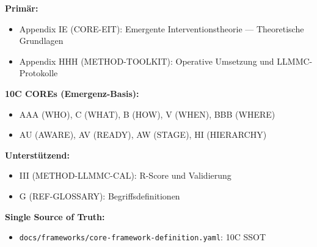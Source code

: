 \begin{tcolorbox}[colback=gray!5!white, colframe=gray!75!black,
    title=Appendix-Referenzen]

\textbf{Primär:}
\begin{itemize}[nosep]
\item Appendix IE (CORE-EIT): Emergente Interventionstheorie --- Theoretische Grundlagen
\item Appendix HHH (METHOD-TOOLKIT): Operative Umsetzung und LLMMC-Protokolle
\end{itemize}

\textbf{10C COREs (Emergenz-Basis):}
\begin{itemize}[nosep]
\item AAA (WHO), C (WHAT), B (HOW), V (WHEN), BBB (WHERE)
\item AU (AWARE), AV (READY), AW (STAGE), HI (HIERARCHY)
\end{itemize}

\textbf{Unterstützend:}
\begin{itemize}[nosep]
\item III (METHOD-LLMMC-CAL): R-Score und Validierung
\item G (REF-GLOSSARY): Begriffsdefinitionen
\end{itemize}

\textbf{Single Source of Truth:}
\begin{itemize}[nosep]
\item \texttt{docs/frameworks/core-framework-definition.yaml}: 10C SSOT
\end{itemize}

\end{tcolorbox}

